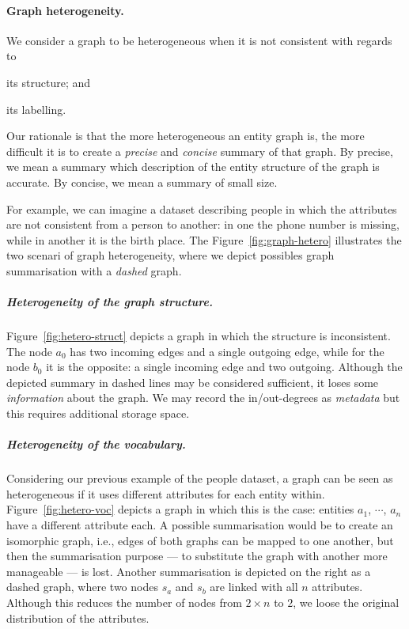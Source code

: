 \paragraph{Graph heterogeneity.}

We consider a graph to be heterogeneous when it is not consistent with regards to
\begin{inparaenum}[(a)]
\item its structure; and
\item its labelling.
\end{inparaenum}
Our rationale is that the more heterogeneous an entity graph is, the more difficult it is to create a \emph{precise} and \emph{concise} summary of that graph. By precise, we mean a summary which description of the entity structure of the graph is accurate. By concise, we mean a summary of small size.

For example, we can imagine a dataset describing people in which the attributes are not consistent from a person to another: in one the phone number is missing, while in another it is the birth place. The Figure~\ref{fig:graph-hetero} illustrates the two scenari of graph heterogeneity, where we depict possibles graph summarisation with a \textit{dashed} graph.

\subparagraph{Heterogeneity of the graph structure.}

Figure~\ref{fig:hetero-struct} depicts a graph in which the structure is inconsistent. The node $a_0$ has two incoming edges and a single outgoing edge, while for the node $b_0$ it is the opposite: a single incoming edge and two outgoing. Although the depicted summary in dashed lines may be considered sufficient, it loses some \emph{information} about the graph. We may record the in/out-degrees as \emph{metadata} but this requires additional storage space.

\subparagraph{Heterogeneity of the vocabulary.}

Considering our previous example of the people dataset, a graph can be seen as heterogeneous if it uses different attributes for each entity within. Figure~\ref{fig:hetero-voc} depicts a graph in which this is the case: entities $a_1$, $\cdots$, $a_n$ have a different attribute each. A possible summarisation would be to create an isomorphic graph, i.e., edges of both graphs can be mapped to one another, but then the summarisation purpose --- to substitute the graph with another more manageable --- is lost. Another summarisation is depicted on the right as a dashed graph, where two nodes $s_a$ and $s_b$ are linked with all $n$ attributes. Although this reduces the number of nodes from $2 \times n$ to $2$, we loose the original distribution of the attributes.\\

